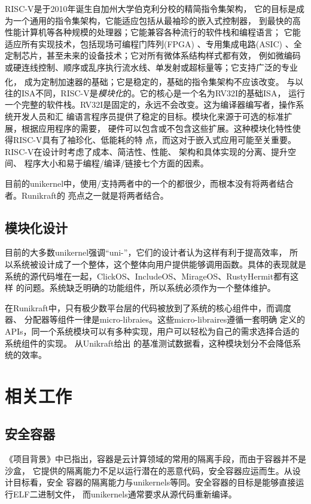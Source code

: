 \documentclass[UTF8,fontset=none,linespread=1.15]{ctexart}
\let\nosupcite\cite
\renewcommand*{\cite}[1]{\textsuperscript{\nosupcite{#1}}}
\begin{document}
RISC-V是于2010年诞生自加州大学伯克利分校的精简指令集架构，
它的目标是成为一个通用的指令集架构，它能适应包括从最袖珍的嵌入式控制器，
到最快的高性能计算机等各种规模的处理器；它能兼容各种流行的软件栈和编程语言；
它能适应所有实现技术，包括现场可编程门阵列(FPGA)
 、专用集成电路(ASIC) 、全定制芯片，甚至未来的设备技术；它对所有微体系结构样式都有效，
例如微编码或硬连线控制、顺序或乱序执行流水线、单发射或超标量等；它支持广泛的专业化，
成为定制加速器的基础；它是稳定的，基础的指令集架构不应该改变。\cite{bib:risc-v-manual}
与以往的ISA不同，RISC-V是\textit{模块化}的。它的核心是一个名为RV32I的基础ISA，
运行一个完整的软件栈。RV32I是固定的，永远不会改变。这为编译器编写者，操作系统开发人员和汇
编语言程序员提供了稳定的目标。模块化来源于可选的标准扩展，根据应用程序的需要，
硬件可以包含或不包含这些扩展。这种模块化特性使得RISC-V具有了袖珍化、低能耗的特
点，而这对于嵌入式应用可能至关重要。RISC-V在设计时考虑了成本、简洁性、性能、
架构和具体实现的分离、提升空间、
程序大小和易于编程/编译/链接七个方面的因素。

目前的unikernel中，使用/支持两者中的一个的都很少，而根本没有将两者结合者。Runi\-kraft的
亮点之一就是将两者结合。

\subsection{模块化设计}
目前的大多数unikernel强调“uni-”，它们的设计者认为这样有利于提高效率，
所以系统被设计成了一个整体，这个整体向用户提供能够调用函数。具体的表现就是
系统的源代码堆在一起，ClickOS、IncludeOS、MirageOS、RustyHermit都有这样
的问题。系统缺乏明确的功能组件，所以系统必须作为一个整体维护。

在Runikraft中，只有极少数平台层的代码被放到了系统的核心组件中，而调度器、
分配器等组件一律是micro-libraies。这些micro-libraires遵循一套明确
定义的APIs，同一个系统模块可以有多种实现，用户可以轻松为自己的需求选择合适的系统组件的实现。
从Unikraft给出
的基准测试数据看，这种模块划分不会降低系统的效率。

\section{相关工作}

\subsection{安全容器}
《项目背景》中已指出，容器是云计算领域的常用的隔离手段，而由于容器并不是沙盒，
它提供的隔离能力不足以运行潜在的恶意代码，安全容器应运而生。从设计目标看，安全
容器的隔离能力与unikernels等同。安全容器的目标是能够直接运行ELF二进制文件，
而unikernels通常要求从源代码重新编译。
\end{document}
